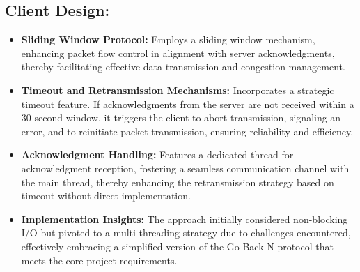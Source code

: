\documentclass{article}
\begin{document}
\subsection*{Client Design:}
\begin{itemize}
    \item \textbf{Sliding Window Protocol:} Employs a sliding window mechanism, enhancing packet flow control in alignment with server acknowledgments, thereby facilitating effective data transmission and congestion management.
    
    \item \textbf{Timeout and Retransmission Mechanisms:} Incorporates a strategic timeout feature. If acknowledgments from the server are not received within a 30-second window, it triggers the client to abort transmission, signaling an error, and to reinitiate packet transmission, ensuring reliability and efficiency.
    
    \item \textbf{Acknowledgment Handling:} Features a dedicated thread for acknowledgment reception, fostering a seamless communication channel with the main thread, thereby enhancing the retransmission strategy based on timeout without direct implementation.
    
    \item \textbf{Implementation Insights:} The approach initially considered non-blocking I/O but pivoted to a multi-threading strategy due to challenges encountered, effectively embracing a simplified version of the Go-Back-N protocol that meets the core project requirements.
\end{itemize}
\end{document}
